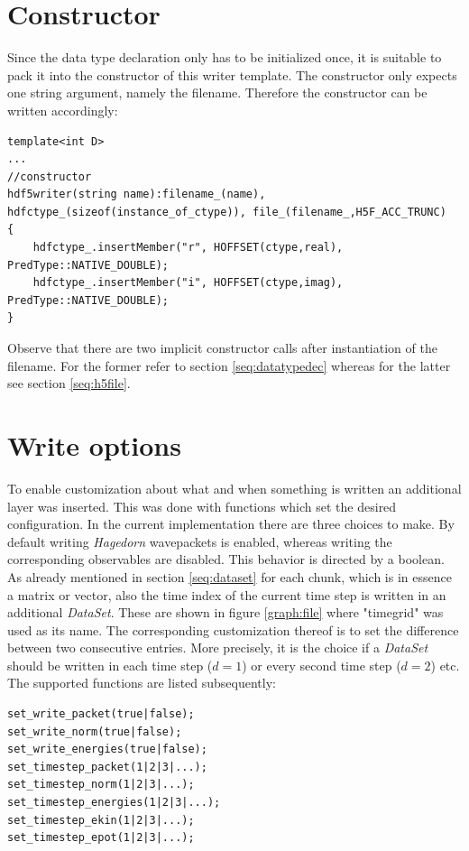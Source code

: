 \section{Constructor}
\label{seq:ctor}
Since the data type declaration only has to be initialized once, it is suitable to pack it into the constructor of this writer template. The constructor only expects one string argument, namely the filename. Therefore the constructor can be written accordingly:
\begin{lstlisting}
template<int D>
...
//constructor
hdf5writer(string name):filename_(name), hdfctype_(sizeof(instance_of_ctype)), file_(filename_,H5F_ACC_TRUNC)
{
	hdfctype_.insertMember("r", HOFFSET(ctype,real), PredType::NATIVE_DOUBLE);
	hdfctype_.insertMember("i", HOFFSET(ctype,imag), PredType::NATIVE_DOUBLE);
}
\end{lstlisting}
Observe that there are two implicit constructor calls after instantiation of the filename. For the former refer to section \ref{seq:datatypedec} whereas for the latter see section \ref{seq:h5file}.

\section{Write options}
To enable customization about what and when something is written an additional layer was inserted. This was done with functions which set the desired configuration. In the current implementation there are three choices to make. By default writing \textit{Hagedorn} wavepackets is enabled, whereas writing the corresponding observables are disabled. This behavior is directed by a boolean. 
As already mentioned in section \ref{seq:dataset} for each chunk, which is in essence a matrix or vector, also the time index of the current time step is written in an additional \textit{DataSet}. These are shown in figure \ref{graph:file} where "timegrid" was used as its name. The corresponding customization thereof is to set the difference between two consecutive entries. More precisely, it is the choice if a \textit{DataSet} should be written in each time step ($d=1$) or every second time step ($d=2$) etc. The supported functions are listed subsequently:
\begin{lstlisting}
set_write_packet(true|false);
set_write_norm(true|false);
set_write_energies(true|false);
set_timestep_packet(1|2|3|...);
set_timestep_norm(1|2|3|...);
set_timestep_energies(1|2|3|...);
set_timestep_ekin(1|2|3|...);
set_timestep_epot(1|2|3|...);
\end{lstlisting}

